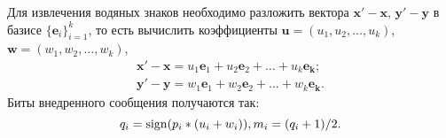 Для извлечения водяных знаков необходимо разложить вектора $\mathbf{x'} - \mathbf{x}$, 
$\mathbf{y'} - \mathbf{y}$ в базисе $\{\mathbf{e}_i\}_{i=1}^k$, то есть вычислить коэффициенты 
$\mathbf{u} = (u_1, u_2, \dots, u_k)$, $\mathbf{w} = (w_1, w_2, \dots, w_k)$, 
\begin{eqnarray*}
  \mathbf{x'} - \mathbf{x} = u_1 \mathbf{e}_1 + u_2 \mathbf{e}_2 + \dots + u_k \mathbf{e_k}; \\ 
  \mathbf{y'} - \mathbf{y} = w_1 \mathbf{e}_1 + w_2 \mathbf{e}_2 + \dots + w_k \mathbf{e_k}.  
\end{eqnarray*}
Биты внедренного сообщения получаются так:
$$q_i = \operatorname{sign}(p_i * (u_i + w_i)), m_i = (q_i + 1) / 2.$$
